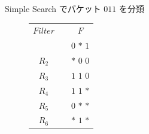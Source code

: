 \documentclass[12pt,dvipdfmx,mathserif,uplatex,aspectratio=32]{beamer}
\makeatletter
\newcommand{\tblcaption}[1]{\def\@captype{table}\caption{#1}}
\makeatother
\begin{document}
\begin{frame}{Simple Search でパケット $011$ を分類}
\vspace{3mm}

\begin{figure}[h]
\begin{center}
 \def\@captype{table}
 \begin{minipage}[t]{.48\textwidth}
  \begin{center}
  \begin{tabular}{ccc}
        & &    \\ \hline
 $Filter $& & $F$ \\ \hline
 \color{red}{$R_{1}$} & & {\color{red} $0$} $*$ $1$ \\ 
 $R_{2}$ & & $*$ $0$ $0$ \\ 
 $R_{3}$ & & $1$ $1$ $0$ \\ 
 $R_{4}$ & & $1$ $1$ $*$ \\ 
 {\color{red} $R_{5}$} & & {\color{red} $0$} $*$ $*$ \\ 
 $R_{6}$ & & $*$ $1$ $*$ \\ \hline
  \end{tabular}
  \end{center}
 \end{minipage}
 \hfill
 \begin{minipage}[c]{.40\textwidth}
 \scalebox{0.7}{}
 \end{minipage}
\end{center}
\end{figure}

\vspace{10mm}
\end{frame}
\end{document}

